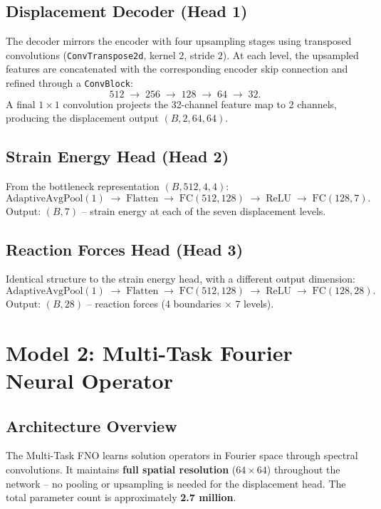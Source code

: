 \documentclass[11pt,a4paper]{article}
\begin{document}
\subsection{Displacement Decoder (Head 1)}

The decoder mirrors the encoder with four upsampling stages using transposed
convolutions (\texttt{ConvTranspose2d}, kernel $2$, stride $2$). At each level,
the upsampled features are concatenated with the corresponding encoder skip
connection and refined through a \texttt{ConvBlock}:
\[
    512 \;\to\; 256 \;\to\; 128 \;\to\; 64 \;\to\; 32.
\]
A final $1 \times 1$ convolution projects the 32-channel feature map to 2
channels, producing the displacement output $(B, 2, 64, 64)$.

\subsection{Strain Energy Head (Head 2)}

From the bottleneck representation $(B, 512, 4, 4)$:
\[
    \text{AdaptiveAvgPool}(1) \;\to\; \text{Flatten} \;\to\;
    \text{FC}(512, 128) \;\to\; \text{ReLU} \;\to\; \text{FC}(128, 7).
\]
Output: $(B, 7)$ -- strain energy at each of the seven displacement levels.

\subsection{Reaction Forces Head (Head 3)}

Identical structure to the strain energy head, with a different output dimension:
\[
    \text{AdaptiveAvgPool}(1) \;\to\; \text{Flatten} \;\to\;
    \text{FC}(512, 128) \;\to\; \text{ReLU} \;\to\; \text{FC}(128, 28).
\]
Output: $(B, 28)$ -- reaction forces (4 boundaries $\times$ 7 levels).


\section{Model 2: Multi-Task Fourier Neural Operator}
\label{sec:fno}

\subsection{Architecture Overview}

The Multi-Task FNO learns solution operators in Fourier space through spectral
convolutions. It maintains \textbf{full spatial resolution} ($64 \times 64$)
throughout the network -- no pooling or upsampling is needed for the
displacement head. The total parameter count is approximately \textbf{2.7 million}.
\end{document}
